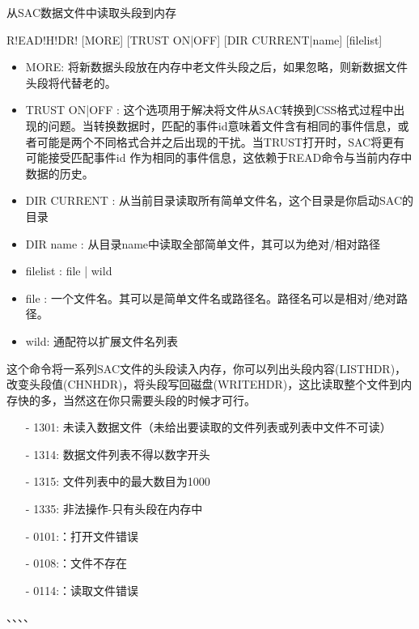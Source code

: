 \label{cmd:readhdr}

从SAC数据文件中读取头段到内存

\begin{SACSTX}
R!EAD!H!DR! [MORE] [TRUST ON|OFF] [DIR CURRENT|name] [filelist]
\end{SACSTX}

\begin{itemize}
\item MORE: 将新数据头段放在内存中老文件头段之后，如果忽略，则新数据文件头段将代替老的。
\item TRUST ON|OFF : 这个选项用于解决将文件从SAC转换到CSS格式过程中出现的问题。当转换数据时，匹配的事件id意味着文件含有相同的事件信息，或者可能是两个不同格式合并之后出现的干扰。当TRUST打开时，SAC将更有可能接受匹配事件id 作为相同的事件信息，这依赖于READ命令与当前内存中数据的历史。
\item DIR CURRENT : 从当前目录读取所有简单文件名，这个目录是你启动SAC的目录 
\item DIR name : 从目录name中读取全部简单文件，其可以为绝对/相对路径 
\item filelist :  file | wild 
\item file : 一个文件名。其可以是简单文件名或路径名。路径名可以是相对/绝对路径。 
\item wild: 通配符以扩展文件名列表 
\end{itemize}

这个命令将一系列SAC文件的头段读入内存，你可以列出头段内容(LISTHDR)，改变头段值(CHNHDR)，将头段写回磁盘(WRITEHDR)，这比读取整个文件到内存快的多，当然这在你只需要头段的时候才可行。

\begin{itemize}
\item[-]1301: 未读入数据文件（未给出要读取的文件列表或列表中文件不可读）
\item[-]1314: 数据文件列表不得以数字开头
\item[-]1315: 文件列表中的最大数目为1000
\item[-]1335: 非法操作-只有头段在内存中
\end{itemize}

\begin{itemize}
\item[-]0101:：打开文件错误
\item[-]0108:：文件不存在
\item[-]0114:：读取文件错误
\end{itemize}

、、、、
